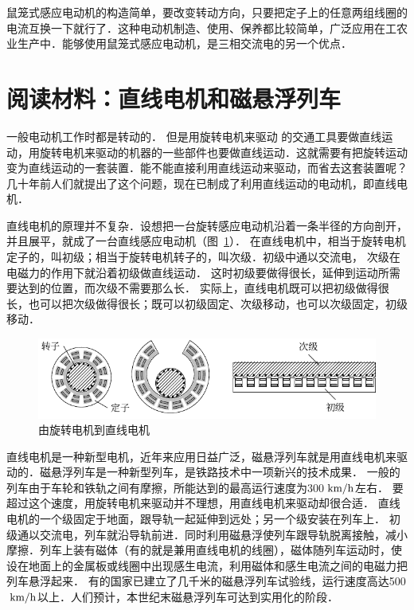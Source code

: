 鼠笼式感应电动机的构造简单，要改变转动方向，只要把定子上的任意两组线圈的电流互换一下就行了．这种电动机制造、使用、保养都比较简单，广泛应用在工农业生产中．能够使用鼠笼式感应电动机，是三相交流电的另一个优点．

\section*{阅读材料：直线电机和磁悬浮列车}

一般电动机工作时都是转动的．
但是用旋转电机来驱动
的交通工具要做直线运动，用旋转电机来驱动的机器的一些部件也要做直线运动．这就需要有把旋转运动变为直线运动的一套装置．能不能直接利用直线运动来驱动，而省去这套装置呢？几十年前人们就提出了这个问题，现在已制成了利用直线运动的电动机，即直线电机．

直线电机的原理并不复杂．设想把一台旋转感应电动机沿着一条半径的方向剖开，并且展平，就成了一台直线感应电动机（图~\ref{fig_C_3-58}）．
在直线电机中，相当于旋转电机定子的，叫初级；相当于旋转电机转子的，叫次级．初级中通以交流电，
次级在电磁力的作用下就沿着初级做直线运动．
这时初级要做得很长，延伸到运动所需要达到的位置，而次级不需要那么长．
实际上，直线电机既可以把初级做得很长，也可以把次级做得很长；既可以初级固定、次级移动，也可以次级固定，初级移动．
\begin{figure}[htbp]
    \centering
    \includegraphics{fig/C/3-58.pdf}
    \caption{由旋转电机到直线电机}\label{fig_C_3-58}
\end{figure}

直线电机是一种新型电机，近年来应用日益广泛，磁悬浮列车就是用直线电机来驱动的．磁悬浮列车是一种新型列车，是铁路技术中一项新兴的技术成果．
一般的列车由于车轮和铁轨之间有摩擦，所能达到的最高运行速度为300$\;\text{km}/\text{h}$左右．
要超过这个速度，用旋转电机来驱动并不理想，用直线电机来驱动却很合适．
直线电机的一个级固定于地面，跟导轨一起延伸到远处；另一个级安装在列车上．
初级通以交流电，列车就沿导轨前进．同时利用磁悬浮使列车跟导轨脱离接触，减小摩擦．列车上装有磁体（有的就是兼用直线电机的线圈），磁体随列车运动时，使设在地面上的金属板或线圈中出现感生电流，利用磁体和感生电流之间的电磁力把列车悬浮起来．
有的国家已建立了几千米的磁悬浮列车试验线，运行速度高达500$\;\text{km}/\text{h}$以上．人们预计，本世纪末磁悬浮列车可达到实用化的阶段．

